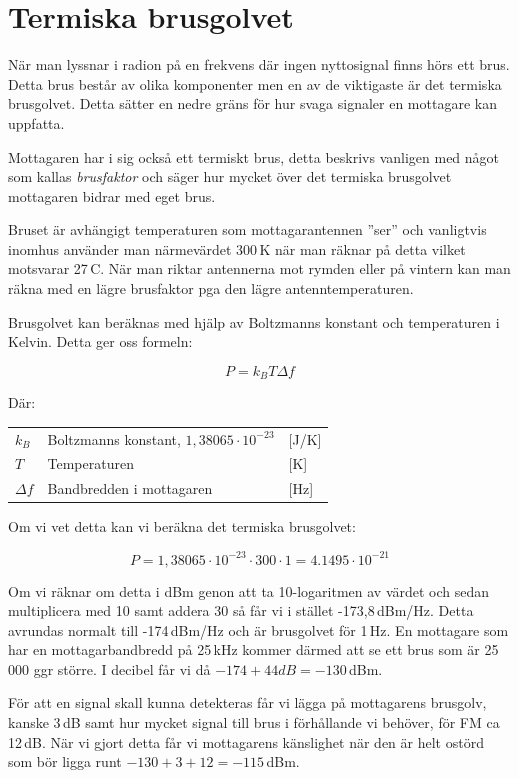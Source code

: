 \section{Termiska brusgolvet}

När man lyssnar i radion på en frekvens där ingen nyttosignal finns hörs ett
brus. Detta brus består av olika komponenter men en av de viktigaste är det
termiska brusgolvet. Detta sätter en nedre gräns för hur svaga signaler en
mottagare kan uppfatta.

Mottagaren har i sig också ett termiskt brus, detta beskrivs vanligen med
något som kallas \textit{brusfaktor} och säger hur mycket över det termiska
brusgolvet mottagaren bidrar med eget brus.

Bruset är avhängigt temperaturen som mottagarantennen ''ser'' och vanligtvis
inomhus använder man närmevärdet 300\,K när man räknar på detta vilket
motsvarar 27\,\textdegree C. När man riktar antennerna mot rymden eller på
vintern kan man räkna med en lägre brusfaktor pga den lägre
antenntemperaturen.

Brusgolvet kan beräknas med hjälp av Boltzmanns konstant och temperaturen i
Kelvin. Detta ger oss formeln:

\begin{equation}
	P=k_BT\Delta f
\end{equation}

Där:

\begin{tabular}{lll}
	$k_B$      & Boltzmanns konstant, $1,38065\cdot 10^{-23}$ & [J/K] \\
	$T$        & Temperaturen                                 & [K]   \\
	$\Delta f$ & Bandbredden i mottagaren                     & [Hz]
\end{tabular}

Om vi vet detta kan vi beräkna det termiska brusgolvet:

$$P = 1,38065\cdot 10^{-23} \cdot 300 \cdot 1 = 4.1495\cdot 10^{-21}$$

Om vi räknar om detta i dBm genon att ta 10-logaritmen av värdet och sedan
multiplicera med 10 samt addera 30 så får vi i stället -173,8\,dBm/Hz. Detta
avrundas normalt till -174\,dBm/Hz och är brusgolvet för 1\,Hz. En mottagare som
har en mottagarbandbredd på 25\,kHz kommer därmed att se ett brus som är
25\,000 ggr större. I decibel får vi då $-174 + 44 dB = -130$\,dBm.

För att en signal skall kunna detekteras får vi lägga på mottagarens brusgolv,
kanske 3\,dB samt hur mycket signal till brus i förhållande vi behöver, för FM
ca 12\,dB. När vi gjort detta får vi mottagarens känslighet när den är helt
ostörd som bör ligga runt $-130 + 3 + 12 = -115$\,dBm.

